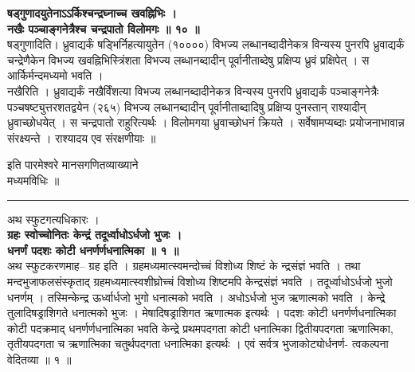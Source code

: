 \documentclass[11pt, openany]{book}
\begin{document}
{{{{\vspace{2mm}
\centering
\textbf{षड्गुणादयुतेनाऽऽर्किश्चन्द्रघ्नाच्च खवह्निभिः ।\\
 \hspace{0.75cm}
 नखैः पञ्चाङ्गनेत्रैश्च चन्द्रपातो विलोमगः ॥ १० ॥}\\
 
\vspace{2mm}
\justifying
 षड्गुणादिति। ध्रुवाद्यर्कं षड्भिर्निहत्यायुतेन (१००००) विभज्य
लब्धानब्दादीनेकत्र विन्यस्य पुनरपि ध्रुवाद्यर्कं चन्द्रेणैकेन विभज्य
खवह्निभिस्त्रिंशता
विभज्य लब्धानब्दादीन् पूर्वानीताब्देषु प्रक्षिप्य ध्रुवं प्रक्षिपेत्
। स आर्किर्मन्दमध्यमो भवति ।\\
\indent
 नखैरिति । ध्रुवाद्यर्कं नखैर्विंशत्या विभज्य लब्धानब्दादीनेकत्र
विन्यस्य
पुनरपि ध्रुवाद्यर्कं पञ्चाङ्गनेत्रैः पञ्चषष्ट्युत्तरशतद्वयेन (२६५)
विभज्य लब्धानब्दादीन् पूर्वानीताब्दादिषु प्रक्षिप्य पुनस्तान् राश्यादीन्
ध्रुवाच्छोधयेत् । स
चन्द्रपातो राहुरित्यर्थः । विलोमगया ध्रुवाच्छोधनं क्रियते ।
सर्वेषामप्यब्दाः
प्रयोजनाभावान्न संरक्ष्यन्ते । राश्यादय एव संरक्षणीयाः ॥

\vspace{2mm}
\centering
 इति पारमेश्वरे मानसगणितव्याख्याने\\
\vspace{2mm}
 मध्यमविधिः ॥\\
\rule{0.2\linewidth}{1.0pt}


\newpage
\thispagestyle{fancy}
\fancyhf{}
\rhead{[स्फुटगत्यधिकारः]}

\centering
 अथ स्फुटगत्यधिकारः ।\\
 
\vspace{3mm}
\textbf{
 ग्रहः स्वोच्चोनितः केन्द्रं तदूर्ध्वाधोऽर्धजो भुजः ।\\
 धनर्णं पदशः कोटी धनर्णर्णधनात्मिका ॥ १ ॥}\\

\vspace{2mm}
\justifying
 अथ स्फुटकरणमाह-- ग्रह इति । ग्रहमध्यमात्स्वमन्दोच्चं विशोध्य
शिष्टं के
न्द्रसंज्ञं भवति । तथा मन्दभुजाफलसंस्कृताद् ग्रहमध्यमात्स्वशीघ्रोच्चं
विशोध्य
शिष्टमपि केन्द्रसंज्ञं भवति । तदूर्ध्वाधोऽर्धजो भुजो धनर्णम् ।
तस्मिन्केन्द्र ऊर्ध्वार्धजो भुगो धनात्मको भवति  ।  अधोऽर्धजो भुज ऋणात्मको भवति  ।  केन्द्रे
तुलादिषड्राशिगते धनात्मको भुजः  ।  मेषादिषड्राशिगत ऋणात्मक  इत्यर्थः ।
पदशः कोटी धनर्णर्णधनात्मिका कोटी पदक्रमाद् धनर्णर्णधनात्मिका भवति
केन्द्रे प्रथमपदगता कोटी धनात्मिका द्वितीयपदगता ऋणात्मिका, तृतीयपदगता च ऋणात्मिका
चतुर्थपदगता धनात्मिका इत्यर्थः । एवं सर्वत्र
भुजाकोट्योर्धनर्ण-
त्वकल्पना वेदितव्या ॥ १ ॥

}}}}
\end{document}
